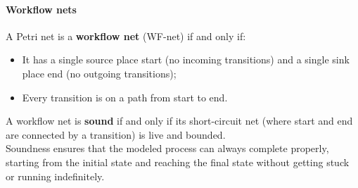 \paragraph{Workflow nets}
A Petri net is a \textbf{workflow net} (WF-net) if and only if:
\begin{itemize}
    \item It has a single source place start (no incoming transitions) and a single sink place end (no outgoing transitions);
    \item Every transition is on a path from start to end.
\end{itemize} 
A workflow net is \textbf{sound} if and only if its short-circuit net (where start and end are connected by a transition) is live and bounded.
\\Soundness ensures that the modeled process can always complete properly, starting from the initial state and reaching the final state without getting stuck or running indefinitely.